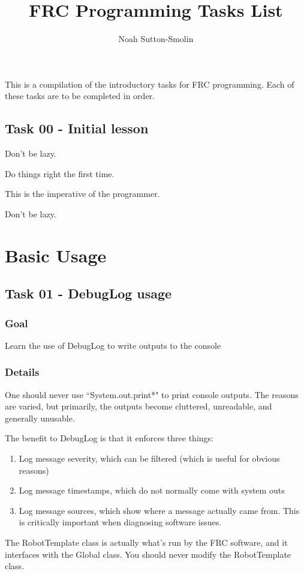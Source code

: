 \documentclass[a4paper]{article}
\title{FRC Programming Tasks List}
\author{Noah Sutton-Smolin}
\begin{document}
\setcounter{tocdepth}{2}\maketitle\tableofcontents\pagebreak

This is a compilation of the introductory tasks for FRC programming. Each of these tasks are to be completed in order.

\subsection{Task 00 - Initial lesson}

Don't be lazy.

Do things right the first time.

This is the imperative of the programmer.

Don't be lazy.
\section{Basic Usage}
\subsection{Task 01 - DebugLog usage}
\subsubsection{Goal} Learn the use of DebugLog to write outputs to the console
\subsubsection{Details} One should never use ``System.out.print*" to print console outputs. The reasons are varied, but primarily, the outputs become cluttered, unreadable, and generally unusable. 

The benefit to DebugLog is that it enforces three things:
\begin{enumerate}\item{Log message severity, which can be filtered (which is useful for obvious reasons)}\item{Log message timestamps, which do not normally come with system outs}\item{Log message sources, which show where a message actually came from. This is critically important when diagnosing software issues.}\end{enumerate}

The RobotTemplate class is actually what's run by the FRC software, and it interfaces with the Global class. You should never modify the RobotTemplate class.
\end{document}

